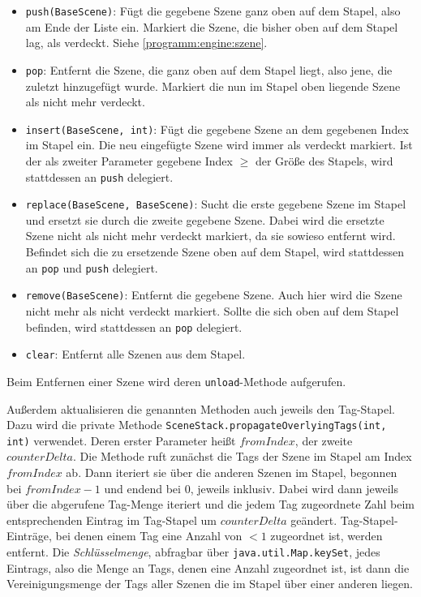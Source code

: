 \begin{sloppypar}
\begin{itemize}
	\item \texttt{push(BaseScene)}: Fügt die gegebene Szene ganz oben auf
	      dem Stapel, also am Ende der Liste ein. Markiert die Szene, die
	      bisher oben auf dem Stapel lag, als verdeckt. Siehe \ref{programm:engine:szene}.
	\item \texttt{pop}: Entfernt die Szene, die ganz oben auf dem Stapel
	      liegt, also jene, die zuletzt hinzugefügt wurde. Markiert die nun
	      im Stapel oben liegende Szene als nicht mehr verdeckt.
	\item \texttt{insert(BaseScene, int)}: Fügt die gegebene Szene an dem
	      gegebenen Index im Stapel ein. Die neu eingefügte Szene wird immer
	      als verdeckt markiert.
	      Ist der als zweiter Parameter gegebene Index $\geq$ der Größe
	      des Stapels, wird stattdessen an \texttt{push} delegiert.
	\item \texttt{replace(BaseScene, BaseScene)}: Sucht die erste gegebene
	      Szene im Stapel und ersetzt sie durch die zweite gegebene Szene.
	      Dabei wird die ersetzte Szene nicht als nicht mehr verdeckt markiert,
	      da sie sowieso entfernt wird.
	      Befindet sich die zu ersetzende Szene oben auf dem Stapel, wird
	      stattdessen an \texttt{pop} und \texttt{push} delegiert.
	\item \texttt{remove(BaseScene)}: Entfernt die gegebene Szene. Auch
	      hier wird die Szene nicht mehr als nicht verdeckt markiert.
		  Sollte die sich oben auf dem Stapel befinden, wird stattdessen an \texttt{pop}
	      delegiert.
	\item \texttt{clear}: Entfernt alle Szenen aus dem Stapel.
\end{itemize}

Beim Entfernen einer Szene wird deren \texttt{unload}-Methode aufgerufen.

Außerdem aktualisieren die genannten Methoden auch jeweils den Tag-Stapel.
Dazu wird die private Methode \texttt{SceneStack.propagateOverlyingTags(int, int)}
verwendet. Deren erster Parameter heißt $fromIndex$, der zweite
$counterDelta$. Die Methode ruft zunächst die Tags der Szene im Stapel
am Index $fromIndex$ ab. Dann iteriert sie über die anderen Szenen im Stapel,
begonnen bei $fromIndex - 1$ und endend bei $0$, jeweils inklusiv. Dabei
wird dann jeweils über die abgerufene Tag-Menge iteriert und die jedem
Tag zugeordnete Zahl beim entsprechenden Eintrag im Tag-Stapel um
$counterDelta$ geändert. Tag-Stapel-Einträge, bei denen einem Tag
eine Anzahl von $< 1$ zugeordnet ist, werden entfernt. Die \textit{Schlüsselmenge},
abfragbar über \texttt{java.util.Map.keySet}, jedes Eintrags, also
die Menge an Tags, denen eine Anzahl zugeordnet ist, ist dann die
Vereinigungsmenge der Tags aller Szenen die im Stapel über einer
anderen liegen.


\end{sloppypar}

